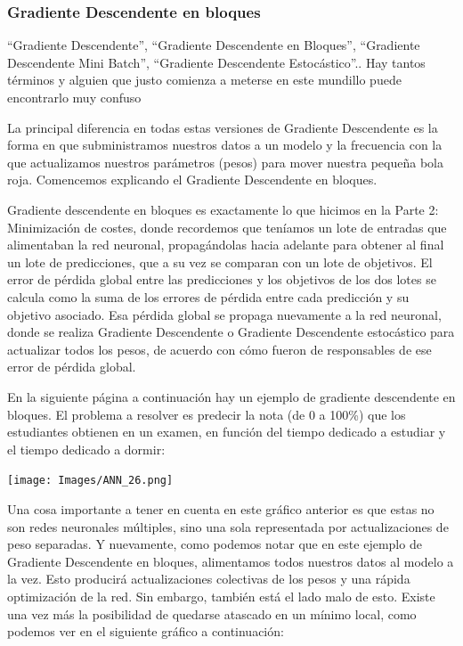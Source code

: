 \documentclass[
]{book}
\begin{document}
\hypertarget{gradiente-descendente-en-bloques}{%
\subsubsection{Gradiente Descendente en bloques}\label{gradiente-descendente-en-bloques}}

``Gradiente Descendente'', ``Gradiente Descendente en Bloques'', ``Gradiente Descendente Mini Batch'', ``Gradiente Descendente Estocástico''.. Hay tantos términos y alguien que justo comienza a meterse en este mundillo puede encontrarlo muy confuso

La principal diferencia en todas estas versiones de Gradiente Descendente es la forma en que subministramos nuestros datos a un modelo y la frecuencia con la que actualizamos nuestros parámetros (pesos) para mover nuestra pequeña bola roja. Comencemos explicando el Gradiente Descendente en bloques.

Gradiente descendente en bloques es exactamente lo que hicimos en la Parte 2: Minimización de costes, donde recordemos que teníamos un lote de entradas que alimentaban la red neuronal, propagándolas hacia adelante para obtener al final un lote de predicciones, que a su vez se comparan con un lote de objetivos. El error de pérdida global entre las predicciones y los objetivos de los dos lotes se calcula como la suma de los errores de pérdida entre cada predicción y su objetivo asociado. Esa pérdida global se propaga nuevamente a la red neuronal, donde se realiza Gradiente Descendente o Gradiente Descendente estocástico para actualizar todos los pesos, de acuerdo con cómo fueron de responsables de ese error de pérdida global.

En la siguiente página a continuación hay un ejemplo de gradiente descendente en bloques. El problema a resolver es predecir la nota (de 0 a 100\%) que los estudiantes obtienen en un examen, en función del tiempo dedicado a estudiar y el tiempo dedicado a dormir:

\texttt{[image: Images/ANN\_26.png]}

Una cosa importante a tener en cuenta en este gráfico anterior es que estas no son redes neuronales múltiples, sino una sola representada por actualizaciones de peso separadas. Y nuevamente, como podemos notar que en este ejemplo de Gradiente Descendente en bloques, alimentamos todos nuestros datos al modelo a la vez. Esto producirá actualizaciones colectivas de los pesos y una rápida optimización de la red. Sin embargo, también está el lado malo de esto. Existe una vez más la posibilidad de quedarse atascado en un mínimo local, como podemos ver en el siguiente gráfico a continuación:
\end{document}
